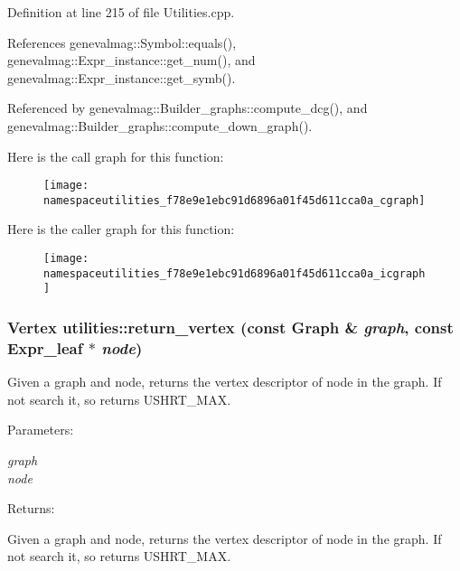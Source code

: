 Definition at line 215 of file Utilities.cpp.

References genevalmag::Symbol::equals(), genevalmag::Expr\_\-instance::get\_\-num(), and genevalmag::Expr\_\-instance::get\_\-symb().

Referenced by genevalmag::Builder\_\-graphs::compute\_\-dcg(), and genevalmag::Builder\_\-graphs::compute\_\-down\_\-graph().

Here is the call graph for this function:\nopagebreak
\begin{figure}[H]
\begin{center}
\leavevmode
\texttt{[image: namespaceutilities\_f78e9e1ebc91d6896a01f45d611cca0a\_cgraph]}
\end{center}
\end{figure}


Here is the caller graph for this function:\nopagebreak
\begin{figure}[H]
\begin{center}
\leavevmode
\texttt{[image: namespaceutilities\_f78e9e1ebc91d6896a01f45d611cca0a\_icgraph]}
\end{center}
\end{figure}
\hypertarget{namespaceutilities_13764073c6966781a6680ab58d88c1b5}{
\subsubsection[{return\_\-vertex}]{\setlength{\rightskip}{0pt plus 5cm}Vertex utilities::return\_\-vertex (const Graph \& {\em graph}, \/  const {\bf Expr\_\-leaf} $\ast$ {\em node})}}
\label{namespaceutilities_13764073c6966781a6680ab58d88c1b5}


Given a graph and node, returns the vertex descriptor of node in the graph. If not search it, so returns USHRT\_\-MAX. \begin{Desc}
\item[Parameters:]
\begin{description}
\item[{\em graph}]\item[{\em node}]\end{description}
\end{Desc}
\begin{Desc}
\item[Returns:]\end{Desc}
Given a graph and node, returns the vertex descriptor of node in the graph. If not search it, so returns USHRT\_\-MAX. 

